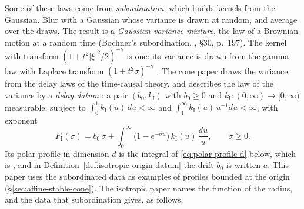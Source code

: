 Some of these laws come from \emph{subordination}, which builds kernels from the Gaussian. Blur
with a Gaussian whose variance is drawn at random, and average over the draws. The result is a
\emph{Gaussian variance mixture}, the law of a Brownian motion at a random time (Bochner's
subordination, , \S30, p.~197). The \Matern{} kernel with transform
$(1 + t^2|\xi|^2/2)^{-\gamma}$ is one: its variance is drawn from the gamma law with Laplace
transform $(1+t^2\sigma)^{-\gamma}$ . The cone paper draws the variance
from the delay laws of the time-causal theory, and describes the law of the variance by a
\emph{delay datum} \label{sec:line-bridge}: a pair $(b_0, k_{\mathrm I})$ with
$b_0 \ge 0$ and $k_{\mathrm I} : (0,\infty) \to [0,\infty)$ measurable, subject to
$\int_0^1 k_{\mathrm I}(u)\,du < \infty$ and $\int_1^\infty k_{\mathrm I}(u)\,u^{-1}du < \infty$,
with exponent
\[
  F_{\mathrm I}(\sigma) = b_0\,\sigma + \int_0^\infty\bigl(1 - e^{-\sigma u}\bigr)\,k_{\mathrm I}(u)\,\frac{du}{u},
  \qquad \sigma \ge 0 .
\]
Its polar profile in dimension $d$ is the integral of \ref{eq:polar-profile-d} below, which is
, and in Definition~\ref{def:isotropic-origin-datum} the drift $b_0$ is written $a$.
This paper uses the subordinated data as examples of profiles bounded at the origin
(\S\ref{sec:affine-stable-cone}). The isotropic paper names the function of the radius, and the
data that subordination gives, as follows.

